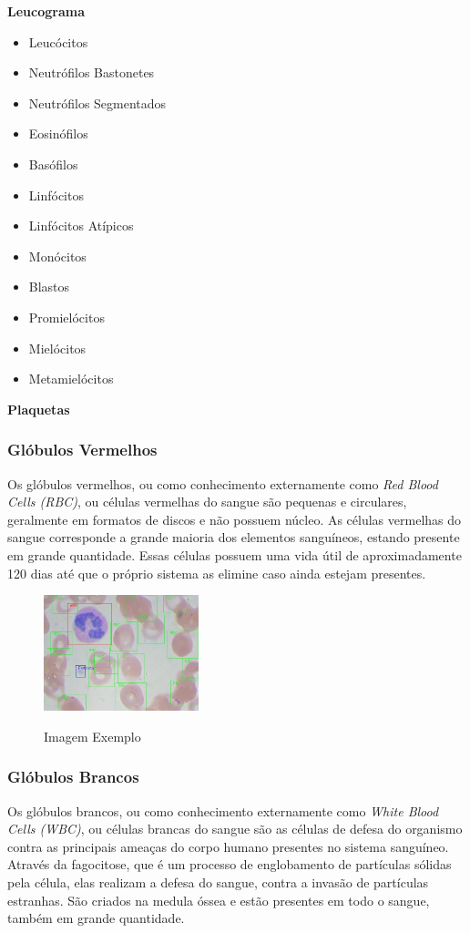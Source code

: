 \textbf{Leucograma}
\begin{itemize}
    \item Leucócitos
    \item Neutrófilos Bastonetes
    \item Neutrófilos Segmentados
    \item Eosinófilos
    \item Basófilos
    \item Linfócitos
    \item Linfócitos Atípicos
    \item Monócitos
    \item Blastos
    \item Promielócitos
    \item Mielócitos
    \item Metamielócitos
\end{itemize}

\textbf{Plaquetas}

\subsubsection{Glóbulos Vermelhos}
Os glóbulos vermelhos, ou como conhecimento externamente como \emph{Red Blood Cells (RBC)}, ou células vermelhas do sangue são pequenas e circulares, geralmente em formatos de discos e não possuem núcleo. As células vermelhas do sangue corresponde a grande maioria dos elementos sanguíneos, estando presente em grande quantidade. Essas células possuem uma vida útil de aproximadamente 120 dias até que o próprio sistema as elimine caso ainda estejam presentes.

\begin{figure}[!htb]
    \centering
    \caption{Imagem Exemplo}
    \includegraphics[width=0.40\textwidth]{img/example.jpg}
    \label{fig:exemplo1}
 \end{figure}
 
\subsubsection{Glóbulos Brancos}
Os glóbulos brancos, ou como conhecimento externamente como \emph{White Blood Cells (WBC)}, ou células brancas do sangue são as células de defesa do organismo contra as principais ameaças do corpo humano presentes no sistema sanguíneo. Através da fagocitose, que é um processo de englobamento de partículas sólidas pela célula, elas realizam a defesa do sangue, contra a invasão de partículas estranhas. São criados na medula óssea e estão presentes em todo o sangue, também em grande quantidade.


